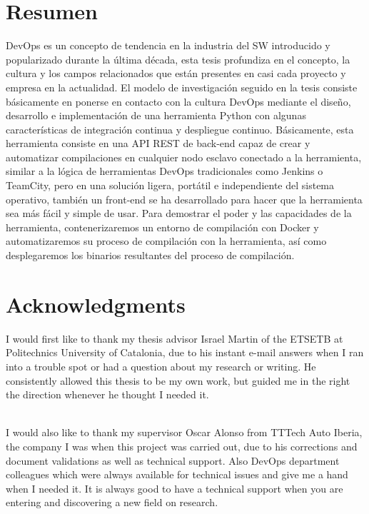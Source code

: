 \documentclass{article}
\begin{document}
\newpage
{}
\section*{Resumen}
DevOps es un concepto de tendencia en la industria del SW introducido y popularizado durante la última década, esta tesis profundiza en el concepto, la cultura y los campos relacionados que están presentes en casi cada proyecto y empresa en la actualidad. El modelo de investigación seguido en la tesis consiste básicamente en ponerse en contacto con la cultura DevOps mediante el diseño, desarrollo e implementación de una herramienta Python con algunas características de integración continua y despliegue continuo. Básicamente, esta herramienta consiste en una API REST de back-end capaz de crear y automatizar compilaciones en cualquier nodo esclavo conectado a la herramienta, similar a la lógica de herramientas DevOps tradicionales como Jenkins o TeamCity, pero en una solución ligera, portátil e independiente del sistema operativo, también un front-end se ha desarrollado para hacer que la herramienta sea más fácil y simple de usar. Para demostrar el poder y las capacidades de la herramienta, contenerizaremos un entorno de compilación con Docker y automatizaremos su proceso de compilación con la herramienta, así como desplegaremos los binarios resultantes del proceso de compilación.

\newpage
{}
\section*{Acknowledgments}
I would first like to thank my thesis advisor Israel Martin of the ETSETB at Politechnics University of Catalonia, due to his instant e-mail answers when I ran into a trouble spot or had a question about my research or writing. He consistently allowed this thesis to be my own work, but guided me in the right the direction whenever he thought I needed it.
\\~

I would also like to thank my supervisor Oscar Alonso from TTTech Auto Iberia, the company I was when this project was carried out, due to his corrections and document validations as well as technical support. Also DevOps department colleagues which were always available for technical issues and give me a hand when I needed it. It is always good to have a technical support when you are entering and discovering a new field on research.
\\~
\end{document}
